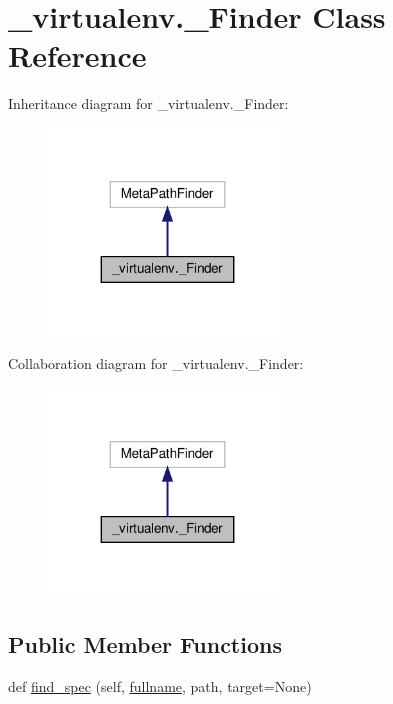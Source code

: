 \hypertarget{class__virtualenv_1_1__Finder}{}\section{\+\_\+virtualenv.\+\_\+\+Finder Class Reference}
\label{class__virtualenv_1_1__Finder}


Inheritance diagram for \+\_\+virtualenv.\+\_\+\+Finder\+:
\nopagebreak
\begin{figure}[H]
\begin{center}
\leavevmode
\includegraphics[width=179pt]{class__virtualenv_1_1__Finder__inherit__graph}
\end{center}
\end{figure}


Collaboration diagram for \+\_\+virtualenv.\+\_\+\+Finder\+:
\nopagebreak
\begin{figure}[H]
\begin{center}
\leavevmode
\includegraphics[width=179pt]{class__virtualenv_1_1__Finder__coll__graph}
\end{center}
\end{figure}
\subsection*{Public Member Functions}
\begin{DoxyCompactItemize}
\item 
def \hyperlink{class__virtualenv_1_1__Finder_a6c37bb7fc99d829588a7f391a623d9ed}{find\+\_\+spec} (self, \hyperlink{class__virtualenv_1_1__Finder_a9bbc4fbd9e39891ce15c7fcd9020fbab}{fullname}, path, target=None)
\end{DoxyCompactItemize}
